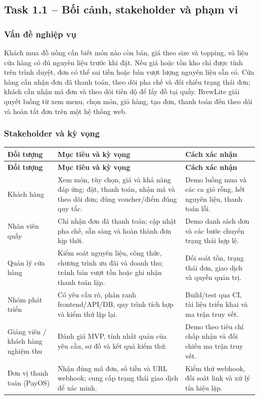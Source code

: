 \subsection{Task 1.1 -- Bối cảnh, stakeholder và phạm vi}

\subsubsection{Vấn đề nghiệp vụ}
Khách mua đồ uống cần biết món nào còn bán, giá theo size và topping, và liệu cửa hàng có đủ nguyên liệu trước khi đặt. Nếu giá hoặc tồn kho chỉ được tính trên trình duyệt, đơn có thể sai tiền hoặc bán vượt lượng nguyên liệu sẵn có. Cửa hàng cần nhận đơn đã thanh toán, theo dõi pha chế và đối chiếu trạng thái đơn; khách cần nhận mã đơn và theo dõi tiến độ để lấy đồ tại quầy. BrewLite giải quyết luồng từ xem menu, chọn món, giỏ hàng, tạo đơn, thanh toán đến theo dõi và hoàn tất đơn trên một hệ thống web.

\subsubsection{Stakeholder và kỳ vọng}
\renewcommand{\arraystretch}{1.25}
\begin{longtable}{@{}>{\raggedright\arraybackslash}p{}>{\raggedright\arraybackslash}p{}>{\raggedright\arraybackslash}p{}@{}}
\toprule
\textbf{Đối tượng} & \textbf{Mục tiêu và kỳ vọng} & \textbf{Cách xác nhận} \\
\midrule
\endfirsthead
\toprule
\textbf{Đối tượng} & \textbf{Mục tiêu và kỳ vọng} & \textbf{Cách xác nhận} \\
\midrule
\endhead
Khách hàng & Xem món, tùy chọn, giá và khả năng đáp ứng; đặt, thanh toán, nhận mã và theo dõi đơn; dùng voucher/điểm đúng quy tắc. & Demo luồng mua và các ca giỏ rỗng, hết nguyên liệu, thanh toán lỗi. \\
Nhân viên quầy & Chỉ nhận đơn đã thanh toán; cập nhật pha chế, sẵn sàng và hoàn thành đơn kịp thời. & Demo danh sách đơn và các bước chuyển trạng thái hợp lệ. \\
Quản lý cửa hàng & Kiểm soát nguyên liệu, công thức, chương trình ưu đãi và doanh thu; tránh bán vượt tồn hoặc ghi nhận thanh toán lặp. & Đối soát tồn, trạng thái đơn, giao dịch và quyền quản trị. \\
Nhóm phát triển & Có yêu cầu rõ, phân ranh frontend/API/DB, quy trình tích hợp và kiểm thử lặp lại. & Build/test qua CI, tài liệu triển khai và ma trận truy vết. \\
Giảng viên / khách hàng nghiệm thu & Đánh giá MVP, tính nhất quán của yêu cầu, sơ đồ và kết quả kiểm thử. & Demo theo tiêu chí chấp nhận và đối chiếu ma trận truy vết. \\
Đơn vị thanh toán (PayOS) & Nhận đúng mã đơn, số tiền và URL webhook; cung cấp trạng thái giao dịch để xác minh. & Kiểm thử webhook, đối soát link và xử lý tín hiệu lặp. \\
\bottomrule
\end{longtable}

